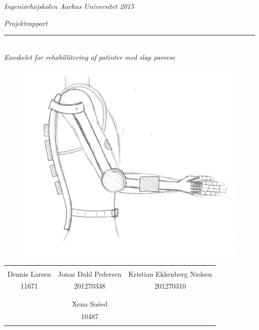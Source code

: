 \thispagestyle{empty}

\begin{center}
\textsl{Ingeniørhøjskolen Aarhus Universitet 2015 } \\ \vspace{0.5cm}

\phantom{hul}

\textsl{\HUGE Projektrapport } \\ \vspace{0cm}
\rule{15cm}{0.5mm}  \\ \vspace{0.5cm}
\textsl{\LARGE  Exoskelet for rehabillitering af patinter med slap pareese} \\ \vspace{0.5cm}

\vspace{0.5cm}

\begin{figure}[H]
\centering
\includegraphics[width=1\textwidth]{Pictures/Forsidebillede.png}
\label{fig:Forside_foranalyse}
\end{figure}


\vspace{0.7cm}

\begin{table}[H]
	\centering
		\begin{tabular}{c c c}
			\underline{\phantom{mmmmmmmmmmmmmm}} & \underline{\phantom{mmmmmmmmmmmmmm}} & \underline{\phantom{mmmmmmmmmmmmmm}}  \\
			 Dennis Larsen		& Jonas Dahl Pedersen 		& Kristian Ekkenberg Nielsen
			 \\
			 11671				& 201270338						& 201270310	
			 \\ 
			 \\
			 & \underline{\phantom{mmmmmmmmmmmmmm}}\\ 
			 & Xena  Saéed\\
			 & 10487 \\
			&&\\												
		\end{tabular}
\end{table}
\end{center}

